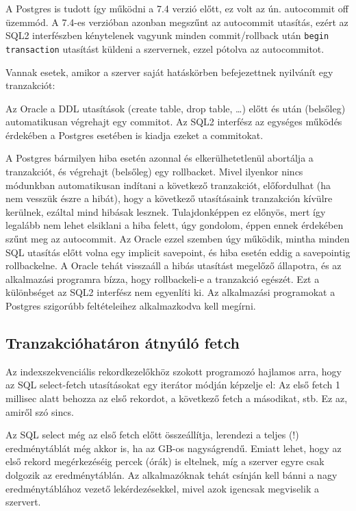 A Postgres is tudott így működni a 7.4 verzió előtt,
ez volt az ún. autocommit off üzemmód. A 7.4-es verzióban azonban
megszűnt az autocommit utasítás, ezért az SQL2 interfészben
kénytelenek vagyunk minden commit/rollback után \verb!begin transaction!
utasítást küldeni a szervernek, ezzel pótolva az autocommitot.

Vannak esetek, amikor a szerver saját hatáskörben
befejezettnek nyilvánít egy tranzakciót:

Az Oracle a DDL utasítások (create table, drop table, \ldots) 
előtt és után (belsőleg) automatikusan végrehajt egy commitot. 
Az SQL2 interfész az egységes működés érdekében a Postgres 
esetében is kiadja ezeket a commitokat.

A Postgres bármilyen hiba esetén azonnal és elkerülhetetlenül
abortálja a tranzakciót, és végrehajt (belsőleg) egy rollbacket.
Mivel ilyenkor nincs módunkban automatikusan indítani a következő
tranzakciót, előfordulhat (ha nem vesszük észre a hibát),
hogy a következő utasításaink tranzakción kívülre kerülnek, 
ezáltal mind hibásak lesznek. Tulajdonképpen ez előnyös,
mert így legalább nem lehet elsiklani a hiba felett, 
úgy gondolom, éppen ennek érdekében szűnt meg az autocommit.
Az Oracle ezzel szemben úgy működik, mintha minden SQL utasítás
előtt volna egy implicit savepoint, és hiba esetén eddig a savepointig
rollbackelne. A Oracle tehát visszaáll a hibás utasítást megelőző állapotra,
és az alkalmazási programra bízza, hogy rollbackeli-e a tranzakció
egészét. Ezt a különbséget az SQL2 interfész nem egyenlíti ki.
Az alkalmazási programokat a Postgres szigorúbb feltételeihez 
alkalmazkodva kell megírni.

\subsection{Tranzakcióhatáron átnyúló fetch}

Az indexszekvenciális rekordkezelőkhöz szokott programozó
hajlamos arra, hogy az SQL select-fetch utasításokat egy iterátor
módján képzelje el: Az első fetch 1 millisec alatt behozza az első 
rekordot, a következő fetch a másodikat, stb. Ez az, amiről szó sincs.

Az SQL select még az első fetch előtt összeállítja, lerendezi
a teljes (!) eredménytáblát még akkor is, ha az GB-os nagyságrendű.
Emiatt lehet, hogy az első rekord megérkezéséig percek (órák) is eltelnek,
míg a szerver egyre csak dolgozik az eredménytáblán. 
Az alkalmazóknak tehát csínján kell bánni a nagy eredménytáblához vezető
lekérdezésekkel, mivel azok igencsak megviselik a szervert. 

